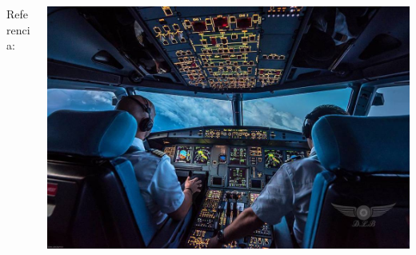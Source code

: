 \begin{frame}
\begin{columns}
\begin{column}{0.5\textwidth}
      {\tiny Referencia: \cite{Introduction_to_Avionics_Systems}}
    \end{column}
  \begin{column}{0.5\textwidth}
    \includegraphics[width=\linewidth]{imagenes/1.2.clasificacion.instrumentos/glass_cockpit.jpg}
  \end{column}
  \end{columns}

\end{frame}

